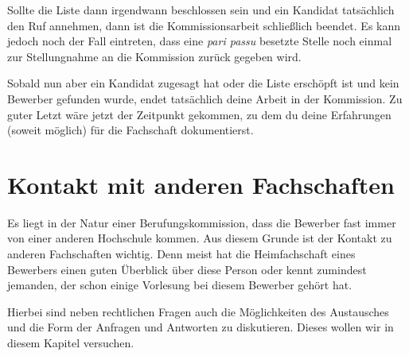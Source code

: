 \documentclass[10pt,twoside,a5paper,openright]{book}
\begin{document}
Sollte die Liste dann irgendwann beschlossen sein und ein Kandidat tatsächlich den Ruf annehmen, dann ist die Kommissionsarbeit schließlich beendet. Es kann jedoch noch der Fall eintreten, dass eine \emph{pari passu} besetzte Stelle noch einmal zur Stellungnahme an die Kommission zurück gegeben wird.

Sobald nun aber ein Kandidat zugesagt hat oder die Liste erschöpft ist und kein Bewerber gefunden wurde, endet tatsächlich deine Arbeit in der Kommission. Zu guter Letzt wäre jetzt der Zeitpunkt gekommen, zu dem du deine Erfahrungen (soweit möglich) für die Fachschaft dokumentierst.



\chapter{Kontakt mit anderen Fachschaften}\thispagestyle{fancy}
Es liegt in der Natur einer Berufungskommission, dass die Bewerber fast immer von einer anderen Hochschule kommen. Aus diesem Grunde ist der Kontakt zu anderen Fachschaften wichtig. Denn meist hat die Heimfachschaft eines Bewerbers einen guten Überblick über diese Person oder kennt zumindest jemanden, der schon einige Vorlesung bei diesem Bewerber gehört hat.

Hierbei sind neben rechtlichen Fragen auch die Möglichkeiten des Austausches und die Form der Anfragen und Antworten zu diskutieren. Dieses wollen wir in diesem Kapitel versuchen.
\end{document}
